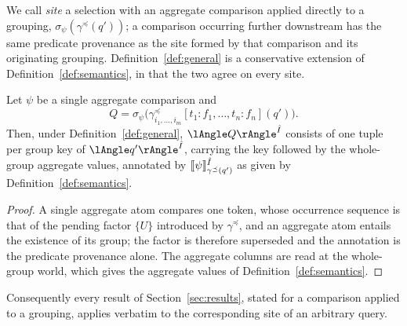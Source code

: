 \begin{toappendix}
We call \emph{site} a selection with an aggregate comparison applied
directly to a grouping, $\sigma_\psi(\gamma^{\preceq}(q'))$; a comparison
occurring further downstream has the same predicate provenance as the
site formed by that comparison and its originating grouping.
Definition~\ref{def:general} is a conservative extension of
Definition~\ref{def:semantics}, in that the two agree on every site.
\begin{proposition}\label{prop:general-agrees}
  Let $\psi$ be a single aggregate comparison and
  \[
    Q=\sigma_\psi\bigl(
        \gamma^{\preceq}_{i_1,\dots,i_m}[t_1{:}f_1,\dots,t_n{:}f_n](q')
      \bigr).
  \]
  Then, under Definition~\ref{def:general}, $\angsem{\hat I}{Q}$ consists
  of one tuple per group key of $\angsem{\hat I}{q'}$, carrying the key
  followed by the whole-group aggregate values, annotated by
  $\llbracket \psi\rrbracket^{\hat I}_{\gamma^{\preceq}(q')}$ as given by
  Definition~\ref{def:semantics}.
\end{proposition}
\begin{proof}
  A single aggregate atom compares one token, whose occurrence sequence
  is that of the pending factor $\{U\}$ introduced by $\gamma^{\preceq}$,
  and an aggregate atom entails the existence of its group; the factor is
  therefore superseded and the annotation is the predicate provenance
  alone. The aggregate columns are read at the whole-group world, which
  gives the aggregate values of Definition~\ref{def:semantics}.
\end{proof}

Consequently every result of Section~\ref{sec:results}, stated for a
comparison applied to a grouping, applies verbatim to the corresponding
site of an arbitrary query.


\end{toappendix}
